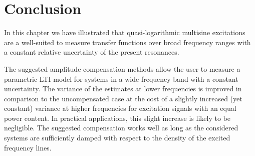 



\section{}
\section{}
\subsection{}
\subsection{}
\subsection{}
\subsection{}
\subsection{}



\section{Conclusion}
\label{sec:excitation:conclusion}
In this chapter we have illustrated that quasi-logarithmic multisine excitations are a well-suited to measure transfer functions over broad frequency ranges with a constant relative uncertainty of the present resonances.

The suggested amplitude compensation methods allow the user to measure a parametric LTI model for systems in a wide frequency band with a constant uncertainty.
The variance of the estimates at lower frequencies is improved in comparison to the uncompensated case at the cost of a slightly increased (yet constant) variance at higher frequencies for excitation signals with an equal power content.
In practical applications, this slight increase is likely to be negligible.
The suggested compensation works well as long as the considered systems are sufficiently damped with respect to the density of the excited frequency lines.

